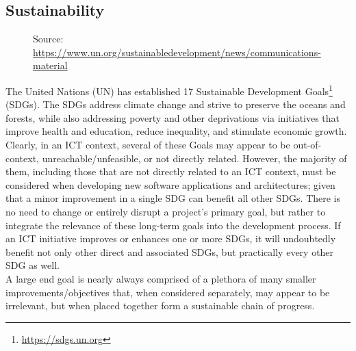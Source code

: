 \subsection{Sustainability}
\label{subsec:introduction_principles_sustainability}

\begin{figure} %
  \centering
  \def\stackalignment{l} %
  {\scriptsize \parbox[t]{\linewidth}{ Source: \url{https://www.un.org/sustainabledevelopment/news/communications-material}} }
\end{figure}

The United Nations (UN) has established 17 Sustainable Development Goals\footnote{\url{https://sdgs.un.org}}
(SDGs). The SDGs address climate change and strive to preserve the oceans and forests,
while also addressing poverty and other deprivations via initiatives that
improve health and education, reduce inequality, and stimulate economic growth. \\ %
Clearly, in an ICT context, several of these Goals may appear to be out-of-context,
unreachable/unfeasible, or not directly related. However, the majority of them, including
those that are not directly related to an ICT context, must be considered when
developing new software applications and architectures; given that a minor improvement
in a single SDG can benefit all other SDGs. There is no need to change or
entirely disrupt a project's primary goal, but rather to integrate the relevance
of these long-term goals into the development process. If an ICT initiative
improves or enhances one or more SDGs, it will undoubtedly benefit not only other
direct and associated SDGs, but practically every other SDG as well. \\ %
A large end goal is nearly always comprised of a plethora of many smaller
improvements/objectives that, when considered separately, may appear to be
irrelevant, but when placed together form a sustainable chain of progress.

